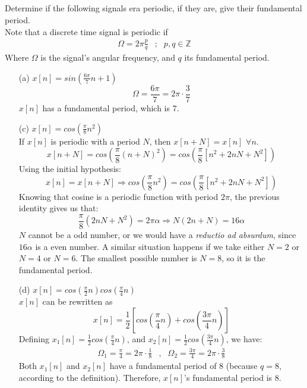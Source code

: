 \documentclass{article}
\begin{document}
\subsection{} Determine if the following signals era periodic, if they are, give their fundamental period. \\
Note that a discrete time signal is periodic if
\begin{equation*}
\begin{array}{lll}\Omega = 2\pi \frac{p}{q}&;&p,q \in \mathbb{Z} \end{array}
\end{equation*}
Where $\Omega$ is the signal's angular frequency, and $q$ its fundamental period.
\begin{enumerate}
\item[(a)] $x[n] = sin(\frac{6\pi}{7}n+1)$ \\
\begin{equation*}
\Omega = \frac{6\pi}{7} = 2\pi \cdot \frac{3}{7}
\end{equation*}
$x[n]$ has a fundamental period, which is 7.
\item[(c)] $x[n] = cos(\frac{\pi}{8}n^{2})$ \\
If $x[n]$ is periodic with a period $N$, then $x[n + N] = x[n]$ $\forall n$.
\begin{equation*}
x[n + N] = cos(\frac{\pi}{8}(n+N)^{2}) = cos(\frac{\pi}{8}[n^{2}+2nN+N^{2}])
\end{equation*}
Using the initial hypothesis:
\begin{equation*}
x[n] = x[n + N] \Rightarrow cos(\frac{\pi}{8}n^{2}) = cos(\frac{\pi}{8}[n^{2}+2nN+N^{2}])
\end{equation*}
Knowing that cosine is a periodic function with period $2\pi$, the previous identity gives us that: 
\begin{equation*}
\frac{\pi}{8}(2nN+N^{2}) = 2\pi\alpha \Rightarrow N(2n+N) = 16\alpha
\end{equation*}
$N$ cannot be a odd number, or we would have a \textit{reductio ad absurdum}, since $16\alpha$ is a even number. A similar situation happens if we take either $N = 2$ or $N=4$ or $N=6$. The smallest possible number is $N=8$, so it is the fundamental period.
\item[(d)] $x[n] = cos(\frac{\pi}{2}n)cos(\frac{\pi}{4}n)$ \\
$x[n]$ can be rewritten as
\begin{equation*}
x[n] = \frac{1}{2}[cos(\frac{\pi}{4}n) + cos(\frac{3\pi}{4}n)]
\end{equation*}
Defining $x_1[n] = \frac{1}{2}cos(\frac{\pi}{4}n)$, and $x_{2}[n] = \frac{1}{2}cos(\frac{3\pi}{4}n)$, we have:
\begin{equation*}
\begin{array}{ccc} \Omega_{1} =  \frac{\pi}{4} = 2\pi \cdot \frac{1}{8}&,& \Omega_{2} =  \frac{3\pi}{4} = 2\pi \cdot \frac{3}{8} \end{array}
\end{equation*}
Both $x_{1}[n]$ and $x_{2}[n]$ have a fundamental period of $8$ (because $q = 8$, according to the definition). Therefore, $x[n]$'s fundamental period is $8$. 
\end{enumerate}
\end{document}
